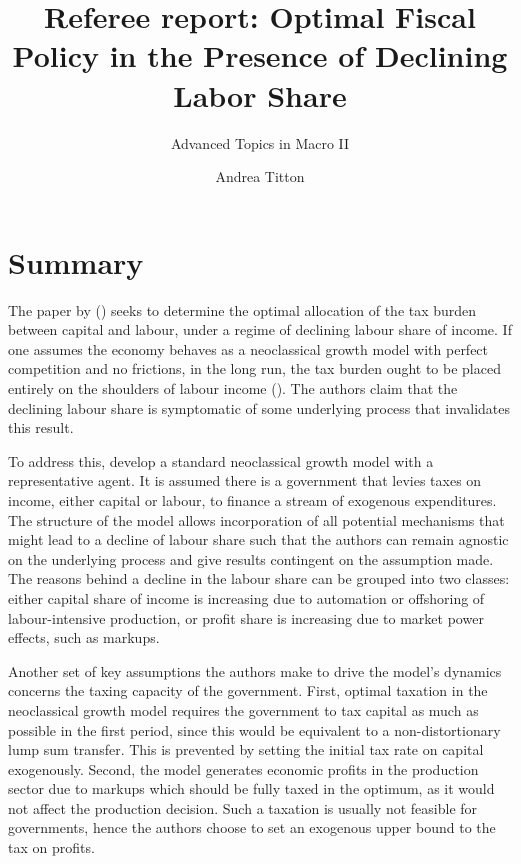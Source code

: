 \documentclass[american]{scrartcl}
\title{Referee report: Optimal Fiscal Policy in the Presence of Declining Labor Share}
\subtitle{Advanced Topics in Macro II}
\author{Andrea Titton}
\newcommand{\citein}[1]{\citeauthor{#1} (\citeyear{#1})}
\begin{document}

\maketitle


\section{Summary}

The paper by \citein{Atesagaoglu2020} seeks to determine the optimal allocation of the tax burden between capital and labour, under a regime of declining labour share of income. If one assumes the economy behaves as a neoclassical growth model with perfect competition and no frictions, in the long run, the tax burden ought to be placed entirely on the shoulders of labour income (\cite{Ramsey1928, Judd1985, Chamley1986}). The authors claim that the declining labour share is symptomatic of some underlying process that invalidates this result.

To address this, \citeauthor{Atesagaoglu2020} develop a standard neoclassical growth model with a representative agent. It is assumed there is a government that levies taxes on income, either capital or labour, to finance a stream of exogenous expenditures. The structure of the model allows incorporation of all potential mechanisms that might lead to a decline of labour share such that the authors can remain agnostic on the underlying process and give results contingent on the assumption made. The reasons behind a decline in the labour share can be grouped into two classes: either capital share of income is increasing due to automation or offshoring of labour-intensive production, or profit share is increasing due to market power effects, such as markups.

Another set of key assumptions the authors make to drive the model's dynamics concerns the taxing capacity of the government. First, optimal taxation in the neoclassical growth model requires the government to tax capital as much as possible in the first period, since this would be equivalent to a non-distortionary lump sum transfer. This is prevented by setting the initial tax rate on capital exogenously. Second, the model generates economic profits in the production sector due to markups which should be fully taxed in the optimum, as it would not affect the production decision. Such a taxation is usually not feasible for governments, hence the authors choose to set an exogenous upper bound to the tax on profits.
\end{document}
